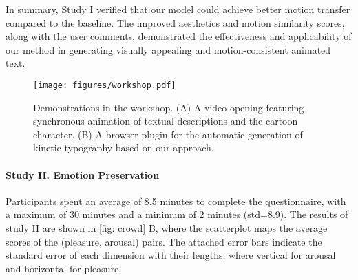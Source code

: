 In summary, Study I verified that our model could achieve better motion transfer compared to the baseline. 
The improved aesthetics and motion similarity scores, along with the user comments, demonstrated the effectiveness and applicability of our method in generating visually appealing and motion-consistent animated text.
\begin{figure*}[h]
  \centering
  \texttt{[image: figures/workshop.pdf]}
  \caption{Demonstrations in the workshop. (A) A video opening featuring synchronous animation of textual descriptions and the cartoon character. (B) A browser plugin for the automatic generation of kinetic typography based on our approach.}
  \label{fig: video}
\end{figure*}
\paragraph{Study II. Emotion Preservation}
Participants spent an average of 8.5 minutes to complete the questionnaire, with a maximum of 30 minutes and a minimum of 2 minutes (std=8.9).
The results of study II are shown in \autoref{fig: crowd} B, where the scatterplot maps the average scores of the (pleasure, arousal) pairs.
The attached error bars indicate the standard error of each dimension with their lengths, where vertical for arousal and horizontal for pleasure.

